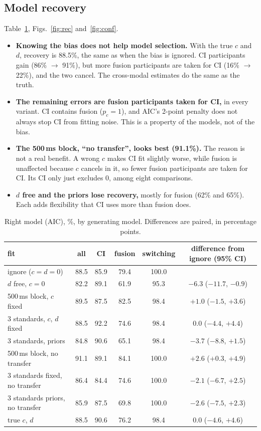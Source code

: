 \documentclass[11pt,a4paper]{article}
\newcommand{\pc}{p_c}
\begin{document}
\subsection{Model recovery}
Table~\ref{tab:rec}, Figs.~\ref{fig:rec} and~\ref{fig:conf}.
\begin{itemize}
\item \textbf{Knowing the bias does not help model selection.} With the true $c$ and $d$, recovery is 88.5\%, the same as when the bias is ignored. CI participants gain (86\% $\to$ 91\%), but more fusion participants are taken for CI (16\% $\to$ 22\%), and the two cancel. The cross-modal estimates do the same as the truth.
\item \textbf{The remaining errors are fusion participants taken for CI,} in every variant. CI contains fusion ($\pc = 1$), and AIC's 2-point penalty does not always stop CI from fitting noise. This is a property of the models, not of the bias.
\item \textbf{The 500\,ms block, ``no transfer'', looks best (91.1\%).} The reason is not a real benefit. A wrong $c$ makes CI fit slightly worse, while fusion is unaffected because $c$ cancels in it, so fewer fusion participants are taken for CI. Its CI only just excludes 0, among eight comparisons.
\item \textbf{$d$ free and the priors lose recovery,} mostly for fusion (62\% and 65\%). Each adds flexibility that CI uses more than fusion does.
\end{itemize}

\begin{table}[H]\centering\small
\begin{tabular}{lccccc}
\toprule
fit & all & CI & fusion & switching & difference from ignore (95\% CI) \\
\midrule
ignore ($c = d = 0$) & 88.5 & 85.9 & 79.4 & 100.0 & \\
$d$ free, $c = 0$ & 82.2 & 89.1 & 61.9 & 95.3 & $-6.3$ ($-11.7$, $-0.9$) \\
500\,ms block, $c$ fixed & 89.5 & 87.5 & 82.5 & 98.4 & $+1.0$ ($-1.5$, $+3.6$) \\
3 standards, $c$, $d$ fixed & 88.5 & 92.2 & 74.6 & 98.4 & $0.0$ ($-4.4$, $+4.4$) \\
3 standards, priors & 84.8 & 90.6 & 65.1 & 98.4 & $-3.7$ ($-8.8$, $+1.5$) \\
500\,ms block, no transfer & 91.1 & 89.1 & 84.1 & 100.0 & $+2.6$ ($+0.3$, $+4.9$) \\
3 standards fixed, no transfer & 86.4 & 84.4 & 74.6 & 100.0 & $-2.1$ ($-6.7$, $+2.5$) \\
3 standards priors, no transfer & 85.9 & 87.5 & 69.8 & 100.0 & $-2.6$ ($-7.5$, $+2.3$) \\
true $c$, $d$ & 88.5 & 90.6 & 76.2 & 98.4 & $0.0$ ($-4.6$, $+4.6$) \\
\bottomrule
\end{tabular}
\caption{Right model (AIC), \%, by generating model. Differences are paired, in percentage points.}\label{tab:rec}
\end{table}
\end{document}
